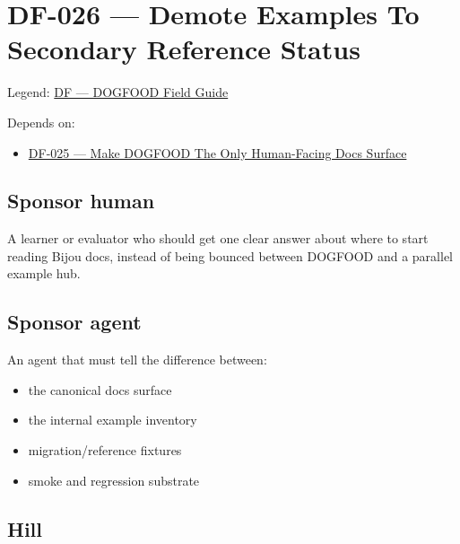 \chapter{DF-026 --- Demote Examples To Secondary Reference Status}\label{record-087}

\smallskip

Legend: \href{https://github.com/flyingrobots/bijou/blob/1853ad902f6bf219326409e7f743a5a1d6517dbc/docs/legends/DF-dogfood-field-guide.md}{DF --- DOGFOOD Field Guide}

Depends on:

\begin{itemize}
\tightlist
\item
  \href{https://github.com/flyingrobots/bijou/blob/cbd70612140e7a450d764b3c7be1c6af878b99bc/docs/design/DF-025-make-dogfood-the-only-human-facing-docs-surface.md}{DF-025 --- Make DOGFOOD The Only Human-Facing Docs Surface}
\end{itemize}

\section{Sponsor human}\label{record-087-sponsor-human}

A learner or evaluator who should get one clear answer about where to start reading Bijou docs, instead of being bounced between DOGFOOD and a parallel example hub.

\section{Sponsor agent}\label{record-087-sponsor-agent}

An agent that must tell the difference between:

\begin{itemize}
\tightlist
\item
  the canonical docs surface
\item
  the internal example inventory
\item
  migration/reference fixtures
\item
  smoke and regression substrate
\end{itemize}

\section{Hill}\label{record-087-hill}

